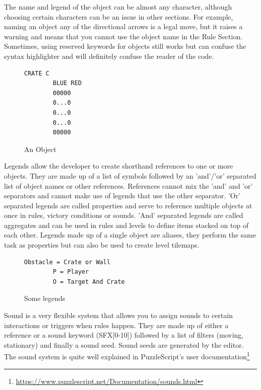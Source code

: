 The name and legend of the object can be almost any character, although choosing certain characters can be an issue in other sections. For example, naming an object any of the directional arrows is a legal move, but it raises a warning and means that you cannot use the object name in the Rule Section. Sometimes, using reserved keywords for objects still works but can confuse the syntax highlighter and will definitely confuse the reader of the code.

\begin{figure}
    \centering
    \begin{lstlisting}[language=PuzzleScript]
        CRATE C
        BLUE RED
        00000
        0...0
        0...0
        0...0
        00000
    \end{lstlisting}
    \caption{An Object}
    \label{fig:object_code_old}
\end{figure}

Legends allow the developer to create shorthand references to one or more objects. They are made up of a list of symbols followed by an 'and'/'or' separated list of object names or other references. References cannot mix the 'and' and 'or' separators and cannot make use of legends that use the other separator. 'Or' separated legends are called properties and serve to reference multiple objects at once in rules, victory conditions or sounds. 'And' separated legends are called aggregates and can be used in rules and levels to define items stacked on top of each other. Legends made up of a single object are aliases, they perform the same task as properties but can also be used to create level tilemaps.

\begin{figure}
    \centering
    \begin{lstlisting}[language=PuzzleScript]
        Obstacle = Crate or Wall
        P = Player
        O = Target And Crate
    \end{lstlisting}
    \caption{Some legends}
    \label{fig:legend_code_old}
\end{figure}

Sound is a very flexible system that allows you to assign sounds to certain interactions or triggers when rules happen. They are made up of either a reference or a sound keyword (SFX[0-10]) followed by a list of filters (moving, stationary) and finally a sound seed. Sound seeds are generated by the editor. The sound system is quite well explained in PuzzleScript's user documentation\footnote{\url{https://www.puzzlescript.net/Documentation/sounds.html}}

